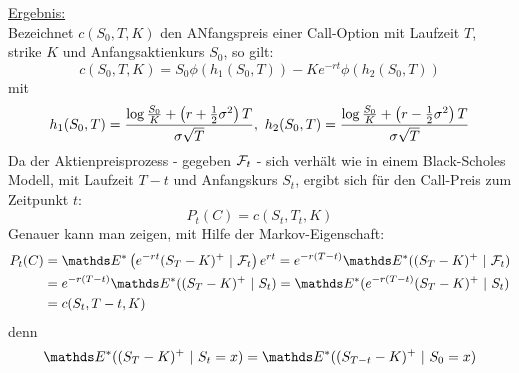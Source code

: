 \uline{Ergebnis:}\\
Bezeichnet $c(S_0,T,K)$ den ANfangspreis einer Call-Option mit Laufzeit $T$, strike $K$ und Anfangsaktienkurs $S_0$, so gilt:
\[
c(S_0,T,K)= S_0\phi(h_1(S_0,T))-Ke^{-rt}\phi(h_2(S_0,T))
\]
mit 
\[
h_1(S_0,T)=\frac{\log\frac{S_0}{K}+\left( r+\frac{1}{2}\sigma^2\right)T}{\sigma\sqrt{T}},~h_2(S_0,T)=\frac{\log\frac{S_0}{K}+\left( r-\frac{1}{2}\sigma^2\right)T}{\sigma\sqrt{T}}
\]
Da der Aktienpreisprozess - gegeben $\mathcal{F}_t$ - sich verhält wie in einem Black-Scholes Modell, mit Laufzeit $T-t$ und Anfangskurs $S_t$, ergibt sich für den Call-Preis zum Zeitpunkt $t$:
\[
P_t(C)=c(S_t,T_t,K)
\]
Genauer kann man zeigen, mit Hilfe der Markov-Eigenschaft:
\begin{equation*}
\begin{aligned}
	P_t(C) &= \E^*\enbrace{e^{-rt}(S_T-K)^+~|~\F_t}e^{rt} = e^{-r(T-t)}\E^*((S_T-K)^+~|~\F_t)\\
	&= e^{-r(T-t)}\E^*((S_T-K)^+~|~S_t) = \E^*(e^{-r(T-t)}(S_T-K)^+~|~S_t)\\
	&= c(S_t,T-t,K)
\end{aligned}
\end{equation*}
denn
\[
\E^*((S_T-K)^+~|~S_t=x) = \E^*((S_{T-t}-K)^+~|~S_0=x)
\]

